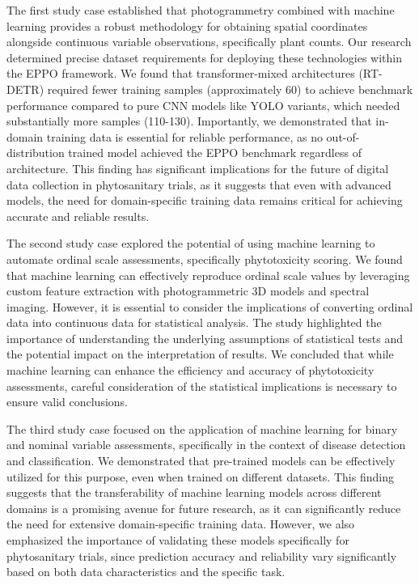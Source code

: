 \documentclass[12pt,a4paper,oneside]{report}
\begin{document}
The first study case established that photogrammetry combined with machine learning 
provides a robust methodology for obtaining spatial coordinates alongside continuous 
variable observations, specifically plant counts. Our research determined precise 
dataset requirements for deploying these technologies within the EPPO framework. 
We found that transformer-mixed architectures (RT-DETR) required fewer training samples 
(approximately 60) to achieve benchmark performance compared to pure CNN models like YOLO 
variants, which needed substantially more samples (110-130). Importantly, we demonstrated that in-domain training 
data is essential for reliable performance, as no out-of-distribution trained model 
achieved the EPPO benchmark regardless of architecture. This finding has significant 
implications for the future of digital data collection in phytosanitary trials, as it
suggests that even with advanced models, the need for domain-specific training data
remains critical for achieving accurate and reliable results.

The second study case explored the potential of using machine learning to
automate ordinal scale assessments, specifically phytotoxicity scoring.
We found that machine learning can effectively reproduce ordinal scale values by 
leveraging custom feature extraction with photogrammetric 3D models and spectral 
imaging. However, it is essential to consider the implications of converting ordinal 
data into continuous data for statistical analysis. 
The study highlighted the importance of understanding
the underlying assumptions of statistical tests and the potential impact on the
interpretation of results. We concluded that while machine learning can enhance
the efficiency and accuracy of phytotoxicity assessments, careful consideration
of the statistical implications is necessary to ensure valid conclusions.

The third study case focused on the application of machine learning for binary and
nominal variable assessments, specifically in the context of disease detection and
classification. We demonstrated that pre-trained models can be effectively
utilized for this purpose, even when trained on different datasets. This finding
suggests that the transferability of machine learning models across different
domains is a promising avenue for future research, as it can significantly reduce
the need for extensive domain-specific training data. However, we also emphasized 
the importance of validating these models specifically for phytosanitary trials, 
since prediction accuracy and reliability vary significantly based on both data 
characteristics and the specific task.
\end{document}
